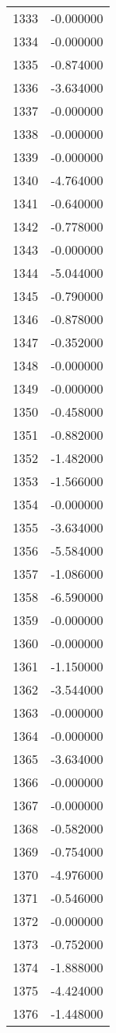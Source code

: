 \documentclass[12pt]{article}
\begin{document}
\begin{longtable}{@{}cc@{}}
1333 & -0.000000 \\
1334 & -0.000000 \\
1335 & -0.874000 \\
1336 & -3.634000 \\
1337 & -0.000000 \\
1338 & -0.000000 \\
1339 & -0.000000 \\
1340 & -4.764000 \\
1341 & -0.640000 \\
1342 & -0.778000 \\
1343 & -0.000000 \\
1344 & -5.044000 \\
1345 & -0.790000 \\
1346 & -0.878000 \\
1347 & -0.352000 \\
1348 & -0.000000 \\
1349 & -0.000000 \\
1350 & -0.458000 \\
1351 & -0.882000 \\
1352 & -1.482000 \\
1353 & -1.566000 \\
1354 & -0.000000 \\
1355 & -3.634000 \\
1356 & -5.584000 \\
1357 & -1.086000 \\
1358 & -6.590000 \\
1359 & -0.000000 \\
1360 & -0.000000 \\
1361 & -1.150000 \\
1362 & -3.544000 \\
1363 & -0.000000 \\
1364 & -0.000000 \\
1365 & -3.634000 \\
1366 & -0.000000 \\
1367 & -0.000000 \\
1368 & -0.582000 \\
1369 & -0.754000 \\
1370 & -4.976000 \\
1371 & -0.546000 \\
1372 & -0.000000 \\
1373 & -0.752000 \\
1374 & -1.888000 \\
1375 & -4.424000 \\
1376 & -1.448000 \\

\end{longtable}
\end{document}

